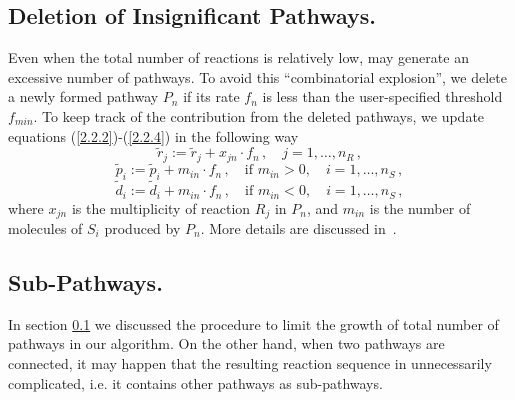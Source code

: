 \subsection{Deletion of Insignificant Pathways.}
\label{sec2c4}
Even when the total number of reactions is relatively low, \pump{} may generate an excessive number of pathways.  To avoid this ``combinatorial explosion'',  we delete a newly formed pathway $P_n$ if its rate $f_n$ is less than the user-specified threshold $f_{min}$.  To keep track of the contribution from the deleted pathways, we update equations (\ref{2.2.2})-(\ref{2.2.4}) in the following way
\begin{equation}
\tilde{r}_j := \tilde{r}_j + x_{jn}\cdot f_n\,,  \quad j = 1,\ldots, n_R\,,
\label{2.6.0}
\end{equation}
\begin{equation}
\tilde{p}_i := \tilde{p}_i + m_{in}\cdot f_n\,, \quad \textrm{if } m_{in} >0, \quad i = 1,\ldots, n_S\,,
\label{2.6.1}
\end{equation}
\begin{equation}
\tilde{d}_i := \tilde{d}_i + m_{in}\cdot f_n\,, \quad \textrm{if } m_{in} <0, \quad i = 1,\ldots, n_S\,,
\label{2.6.2}
\end{equation}
 where $x_{jn}$ is the multiplicity of reaction $R_j$ in $P_n$, and $m_{in}$ is the number of molecules of $S_i$ produced by $P_n$. More details are discussed in~\cite{Lehmann2004/JAC}.
  

\subsection{Sub-Pathways.}
\label{sec2c5}
In section \ref{sec2c4} we discussed the procedure to limit the growth of total number of pathways in our algorithm.  On the other hand, when two pathways are connected, it may happen that the resulting reaction sequence in unnecessarily complicated, i.e. it contains other pathways as sub-pathways. 

